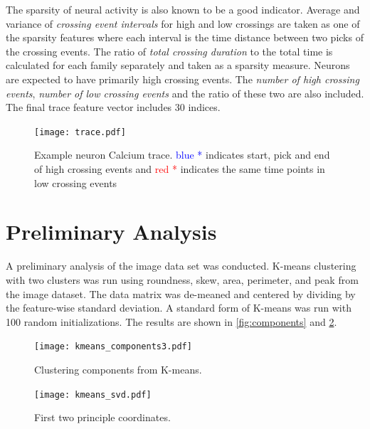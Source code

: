\documentclass[10pt]{article}
\begin{document}
The sparsity of neural activity is also known to be a good indicator. Average and variance of \emph{crossing event intervals} for high and low crossings are taken as one of the sparsity features where each interval is the time distance between two picks of the crossing events.  The ratio of \emph{total crossing duration} to the total time is calculated for each family separately and taken as a sparsity measure. Neurons are expected to have primarily high crossing events. The \emph{number of high crossing events}, \emph{number of low crossing events} and the ratio of these two are also included. The final trace feature vector includes \num{30} indices.

\begin{figure}[h]
    \centering

    \begin{minipage}{1\textwidth}
      \centering
      \texttt{[image: trace.pdf]}
      \caption{\footnotesize Example neuron Calcium trace. \textcolor{blue}{blue *} indicates start, pick and end of high crossing events and \textcolor{red}{red *} indicates the same time points in low crossing events }
      \label{fig:trace}
    \end{minipage}
  
\end{figure}


\section{Preliminary Analysis}

A preliminary analysis of the image data set was conducted.
K-means clustering with two clusters was run using roundness, skew, area, perimeter, and peak from the image dataset. 
The data matrix was de-meaned and centered by dividing by the feature-wise standard deviation.
A standard form of K-means was run with \num{100} random initializations.
The results are shown in \cref{fig:components} and \cref{fig:principle}.

\begin{figure}[h]
    \centering
    \begin{minipage}{.75\textwidth}
      \centering
      \texttt{[image: kmeans\_components3.pdf]}
      \caption{\footnotesize Clustering components from K-means.}
      \label{fig:components}
    \end{minipage}%
    \begin{minipage}{.25\textwidth}
      \centering
      \texttt{[image: kmeans\_svd.pdf]}
      \caption{\footnotesize First two principle coordinates. }
      \label{fig:principle}
    \end{minipage}
\end{figure}
\end{document}

